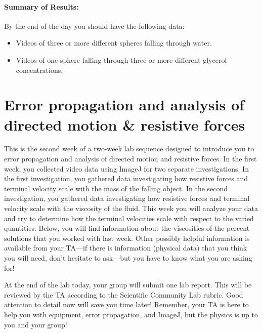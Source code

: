 \paragraph{Summary of Results:\\} 
By the end of the day you should have the following data:
\begin{itemize}
\item Videos of three or more different spheres falling through water.
\item Videos of one sphere falling through three or more different glycerol concentrations.
\end{itemize}

\section{Error propagation and analysis of directed motion \& resistive forces}
This is the second week of a two-week lab sequence designed to introduce you to error propagation and analysis of directed motion and resistive forces.
In the first week, you collected video data using ImageJ for two separate investigations.
In the first investigation, you gathered data investigating how resistive forces and terminal velocity scale with the mass of the falling object.
In the second investigation, you gathered data investigating how resistive forces and terminal velocity scale with the viscosity of the fluid.
This week you will analyze your data and try to determine how the terminal velocities scale with respect to the varied quantities.
Below, you will find information about the viscosities of the percent solutions that you worked with last week.
Other possibly helpful information is available from your TA—if there is information (physical data) that you think you will need, don’t hesitate to ask—but you have to know what you are asking for! \par
At the end of the lab today, your group will submit one lab report.
This will be reviewed by the TA according to the Scientific Community Lab rubric.
Good attention to detail now will save you time later!
Remember, your TA is here to help you with equipment, error propagation, and ImageJ, but the physics is up to you and your group!
\bigskip 
\begin{table}[h]
\centering
{}
\caption{Viscosity of glycerol concentrations by \% volume}
\label{tab:viscosity}
\end{table}

